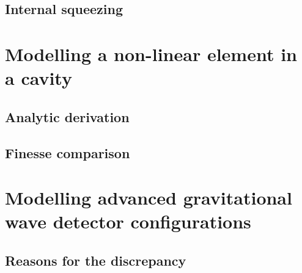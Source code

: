 \documentclass[aps,pra,superscriptaddress,reprint,nofootinbib]{revtex4-1}
\begin{document}
\subsection{Internal squeezing}




\section{Modelling a non-linear element in a cavity}
\label{sec:sqzcavity}

\subsection{Analytic derivation}




\subsection{Finesse comparison}



\section{Modelling advanced gravitational wave detector configurations}
\label{sec:aLIGOcomparison}


\subsection{Reasons for the discrepancy}
\end{document}
